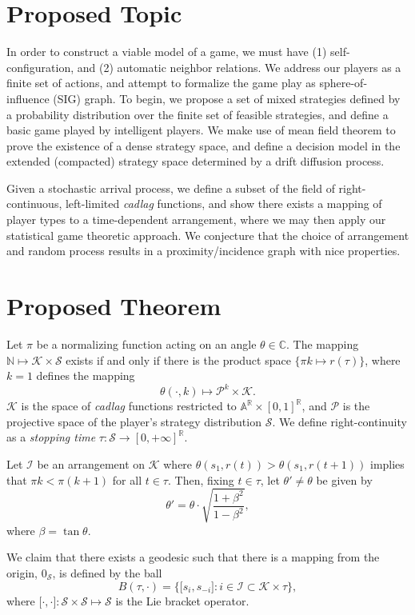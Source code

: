 \documentclass[10pt]{article}
\newcommand{\mcI}{\mathcal{I}}
\newcommand{\mcP}{\mathcal{P}}
\newcommand{\mcK}{\mathcal{K}}
\newcommand{\mcS}{\mathcal{S}}
\theoremstyle{definition}
\begin{document}
\section{Proposed Topic}

In order to construct a
viable model of a game, we must have (1) self-configuration, and (2) automatic neighbor
relations. We address our players as a finite set of actions, and attempt to formalize the game play as sphere-of-
influence (SIG) graph. To begin, we propose a set of mixed strategies defined by a probability
distribution over the finite set of feasible strategies, and define a basic game
played by intelligent players.
We make use of mean field theorem to prove the existence of a dense strategy
space, and define a decision model in the
extended (compacted) strategy space determined by a drift diffusion process.

Given a stochastic arrival process, we define a subset of the field of
right-continuous, left-limited \emph{cadlag} 
functions, and show there exists a mapping of player types to a time-dependent
arrangement, where we may then apply our statistical game theoretic approach.
We conjecture that the choice of arrangement and random process results in a
proximity/incidence graph with nice properties.


\section{Proposed Theorem}

Let $\pi$ be a normalizing function acting on an angle $\theta \in \mathbb{C}$. 
The mapping $\mathbb{N} \mapsto \mcK\times \mcS$ exists if and only if there is
the product space $\lbrace \pi k \mapsto r(\tau)\rbrace$, where $k=1$ defines
the mapping 
$$
    \theta(\cdot, k) \mapsto \mcP^k \times \mcK.
$$
$\mcK$ is the space of \emph{cadlag} functions restricted to
$\mathbb{A}^\mathbb{R} \times [0,1]^\mathbb{R}$,
and $\mcP$ is the projective space of the
player's strategy distribution $\mcS$. We define right-continuity as 
a \emph{stopping time} $\tau:\mcS \rightarrow [0,+\infty]^\mathbb{R}$.

Let $\mcI$ be an arrangement on $\mcK$ where
$\theta (s_1, r(t)) > \theta (s_1, r(t+1))$ implies that $\pi k < \pi
(k+1)$ for all $t\in\tau$.
Then, fixing $t\in \tau$, let $\theta' \ne \theta$ be given by 
$$
    \theta' = \theta \cdot \displaystyle\sqrt{\frac{1+\beta^2}{1-\beta^2}},
$$
where $\beta = \tan\theta$. 

We claim that there exists a geodesic such that there is a
mapping from the origin, $0_{\mcS}$, is defined by the ball
$$
    B(\tau, \cdot) = \lbrace \lbrack s_i, s_{-i}\rbrack : i \in \mcI \subset
    \mcK\times \tau \rbrace,
$$
where $\lbrack \cdot, \cdot\rbrack : \mcS \times \mcS \mapsto \mcS$ is the Lie
bracket operator.
\end{document}
